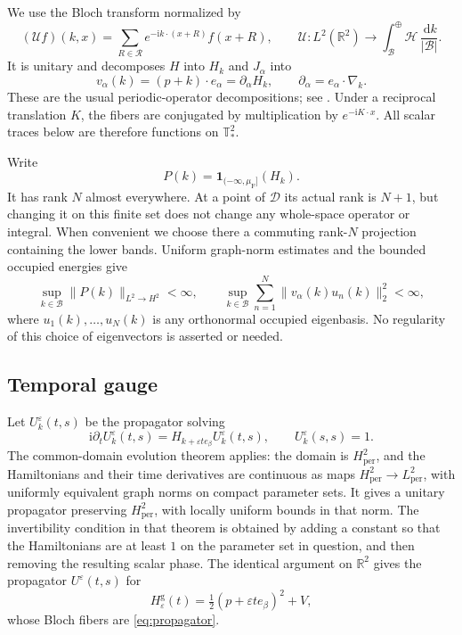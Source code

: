 \documentclass[11pt,a4paper]{article}
\numberwithin{equation}{section}
\newcommand{\R}{\mathbb R}
\newcommand{\T}{\mathbb T}
\newcommand{\one}{\mathbf 1}
\newcommand{\cR}{\mathcal R}
\newcommand{\cB}{\mathcal B}
\newcommand{\cD}{\mathcal D}
\newcommand{\cH}{\mathcal H}
\newcommand{\dd}{\,\mathrm d}
\newcommand{\ii}{\mathrm i}
\theoremstyle{remark}
\begin{document}
We use the Bloch transform normalized by
\begin{equation}\label{eq:bloch}
 (\mathcal U f)(k,x)
   =\sum_{R\in\cR}e^{-\ii k\cdot(x+R)}f(x+R),
 \qquad
 \mathcal U:L^2(\R^2)\longrightarrow
       \int_{\cB}^{\oplus}\cH\,\frac{\dd k}{|\cB|}.
\end{equation}
It is unitary and decomposes $H$ into $H_k$ and $J_\alpha$ into
\begin{equation}\label{eq:velocity}
 v_\alpha(k)=(p+k)\cdot e_\alpha=\partial_\alpha H_k,
 \qquad \partial_\alpha=e_\alpha\cdot\nabla_k.
\end{equation}
These are the usual periodic-operator decompositions; see
\cite[Theorems XIII.97--XIII.99]{RS4}. Under a reciprocal translation
$K$, the fibers are conjugated by multiplication by $e^{-\ii K\cdot x}$.
All scalar traces below are therefore functions on $\T_*^2$.

Write
\begin{equation}\label{eq:fermi-projection}
 P(k)=\one_{(-\infty,\mu_{\mathrm F}]}(H_k).
\end{equation}
It has rank $N$ almost everywhere. At a point of $\cD$ its actual rank
is $N+1$, but changing it on this finite set does not change any
whole-space operator or integral. When convenient we choose there a
commuting rank-$N$ projection containing the lower bands. Uniform
graph-norm estimates and the bounded occupied energies give
\begin{equation}\label{eq:occupied-bound}
 \sup_{k\in\cB}\|P(k)\|_{L^2\to H^2}<\infty,
 \qquad
 \sup_{k\in\cB}\sum_{n=1}^N\|v_\alpha(k)u_n(k)\|_2^2<\infty,
\end{equation}
where $u_1(k),\ldots,u_N(k)$ is any orthonormal occupied eigenbasis.
No regularity of this choice of eigenvectors is asserted or needed.

\subsection{Temporal gauge}

Let $U_k^\varepsilon(t,s)$ be the propagator solving
\begin{equation}\label{eq:propagator}
 \ii\partial_t U_k^\varepsilon(t,s)
       =H_{k+\varepsilon t e_\beta}U_k^\varepsilon(t,s),
 \qquad U_k^\varepsilon(s,s)=1.
\end{equation}
The common-domain evolution theorem
\cite[Theorem X.70]{RS2} applies: the domain is $H^2_{\mathrm{per}}$,
and the Hamiltonians and their time derivatives are continuous as maps
$H^2_{\mathrm{per}}\to L^2_{\mathrm{per}}$, with uniformly equivalent
graph norms on compact parameter sets. It gives a unitary propagator
preserving $H^2_{\mathrm{per}}$, with locally uniform bounds in that
norm. The invertibility condition in that theorem is obtained by adding
a constant so that the Hamiltonians are at least $1$ on the parameter
set in question, and then removing the resulting scalar phase.
The identical argument on $\R^2$ gives the propagator
$U^\varepsilon(t,s)$ for
\[
 H^{\mathrm g}_\varepsilon(t)
     =\tfrac12(p+\varepsilon t e_\beta)^2+V,
\]
whose Bloch fibers are \eqref{eq:propagator}.
\end{document}
